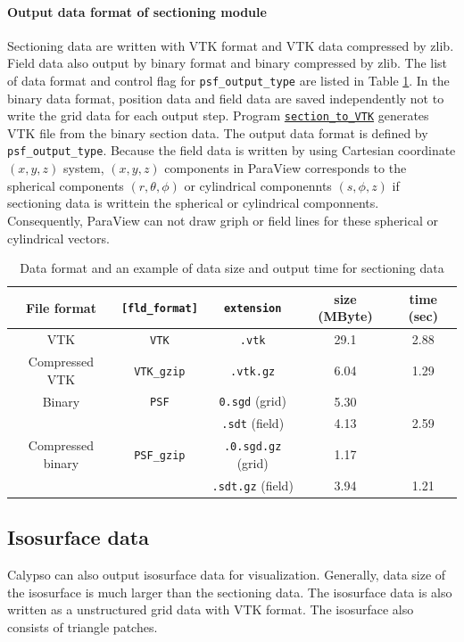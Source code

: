 \paragraph{Output data format of sectioning module}
\label{sec:PSF_data}
Sectioning data are written with VTK format and VTK data compressed by zlib. Field data also output by binary format and binary compressed by zlib. The list of data format and control flag for \verb|psf_output_type| are listed in Table \ref{table:PSF_data}. In the binary data format, position data and field data are saved independently not to write the grid data for each output step. Program \hyperref[section:section_to_VTK]{\tt section\_to\_VTK} generates VTK file from the binary section data. The output data format is defined by \verb|psf_output_type|. Because the field data is written by using Cartesian coordinate $(x,y,z)$ system, $(x,y,z)$ components in ParaView corresponds to the spherical components $(r, \theta, \phi)$ or cylindrical componennts $(s,\phi, z)$ if sectioning data is writtein the spherical or cylindrical componnents. Consequently, ParaView can not draw griph or field lines for these spherical or cylindrical vectors.
%
\begin{table}[htp]
\caption{Data format  and an example of data size and output time  for sectioning data}
\label{table:PSF_data}
\begin{center} 
\begin{tabular}{|c|c|c|c|c|}
\hline
File format & \verb|[fld_format]| & \verb|extension| & size (MByte) & time (sec)  \\ \hline \hline
VTK & \verb|VTK| & \verb|.vtk| & 29.1 & 2.88 \\ \hline
Compressed VTK & \verb|VTK_gzip| & \verb|.vtk.gz| & 6.04 & 1.29 \\ \hline
Binary & \verb|PSF| & \verb|0.sgd| (grid) & 5.30 &  \\
           &        &  \verb|.sdt| (field) & 4.13 & 2.59 \\ \hline
Compressed binary & \verb|PSF_gzip| & \verb|.0.sgd.gz| (grid) & 1.17 & \\
           &        &  \verb|.sdt.gz| (field) & 3.94 & 1.21 \\ \hline
\end{tabular}
\end{center} 
\end{table} 

%
\subsection{Isosurface data}
\label{section:ISO}
%
Calypso can also output isosurface data for visualization. Generally, data size of the isosurface is much larger than the sectioning data. The isosurface data is also written as a unstructured grid data with VTK format. The isosurface also consists of triangle patches.

